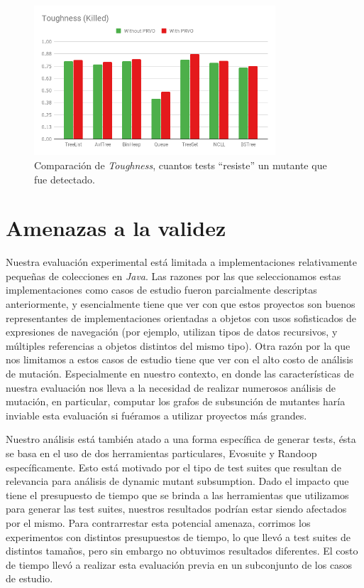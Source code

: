 \begin{figure}
	\begin{center}
		\includegraphics[width=9cm]{figures/ToughnessKilled.png}
	\end{center}
	\caption{Comparaci\'on de \emph{Toughness}, cuantos tests ``resiste'' un mutante que fue detectado.}
	\label{toughnessKilled-results}
\end{figure}


\section{Amenazas a la validez}

Nuestra evaluaci\'on experimental est\'a limitada a implementaciones relativamente peque\~nas de colecciones en \emph{Java}. Las razones por las que seleccionamos estas implementaciones como casos de estudio fueron parcialmente descriptas anteriormente, y esencialmente tiene que ver con que estos proyectos son buenos representantes de implementaciones orientadas a objetos con usos sofisticados de expresiones de navegaci\'on (por ejemplo, utilizan tipos de datos recursivos, y m\'ultiples referencias a objetos distintos del mismo tipo). Otra raz\'on por la que nos limitamos a estos casos de estudio tiene que ver con el alto costo de an\'alisis de mutaci\'on. Especialmente en nuestro contexto, en donde las caracter\'isticas de nuestra evaluaci\'on nos lleva a la necesidad de realizar numerosos an\'alisis de mutaci\'on, en particular, computar los grafos de subsunci\'on de mutantes har\'ia inviable esta evaluaci\'on si fu\'eramos a utilizar proyectos m\'as grandes.

Nuestro an\'alisis est\'a tambi\'en atado a una forma espec\'ifica de generar tests, \'esta se basa en el uso de dos herramientas particulares, Evosuite y Randoop espec\'ificamente. Esto est\'a motivado por el tipo de test suites que resultan de relevancia para an\'alisis de dynamic mutant subsumption. Dado el impacto que tiene el presupuesto de tiempo que se brinda a las herramientas que utilizamos para generar las test suites, nuestros resultados podr\'ian estar siendo afectados por el mismo. Para contrarrestar esta potencial amenaza, corrimos los experimentos con distintos presupuestos de tiempo, lo que llev\'o a test suites de distintos tama\~nos, pero sin embargo no obtuvimos resultados diferentes. El costo de tiempo llev\'o a realizar esta evaluaci\'on previa en un subconjunto de los casos de estudio.

